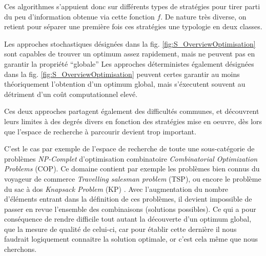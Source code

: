 Ces algorithmes s'appuient donc sur différents types de stratégies pour tirer parti du peu d'information obtenue via cette fonction $f$. De nature très diverse, on retient pour séparer une première fois ces stratégies une typologie en deux classes. 

\begin{itemize}[label=\textbullet]
 Les approches stochastiques désignées dans la fig. \ref{fig:S_OverviewOptimisation} sont capables de trouver un optimum assez rapidement, mais ne peuvent pas en garantir la propriété \enquote{globale}
 Les approches déterministes également désignées dans la fig. \ref{fig:S_OverviewOptimisation} peuvent certes garantir au moins théoriquement l'obtention d'un optimum global, mais s'éxecutent souvent au détriment d'un coût computationnel elevé.
\end{itemize}

Ces deux approches partagent également des difficultés communes, et découvrent leurs limites à des degrés divers en fonction des stratégies mise en oeuvre, dès lors que l'espace de recherche à parcourir devient trop important.

C'est le cas par exemple de l'espace de recherche de toute une sous-catégorie de problèmes \textit{NP-Complet}  d'optimisation combinatoire \textit{Combinatorial Optimization Problems} (COP). Ce domaine contient par exemple les problèmes bien connus du voyageur de commerce \textit{Travelling salesman problem} (TSP), ou encore le problème du sac à dos \textit{Knapsack Problem} (KP) . Avec l'augmentation du nombre d'éléments entrant dans la définition de ces problèmes, il devient impossible de passer en revue l'ensemble des combinaisons (solutions possibles). Ce qui a pour conséquence de rendre difficile tout autant la découverte d'un optimum global, que la mesure de qualité de celui-ci, car pour établir cette dernière il nous faudrait logiquement connaitre la solution optimale, or c'est cela même que nous cherchons. 

